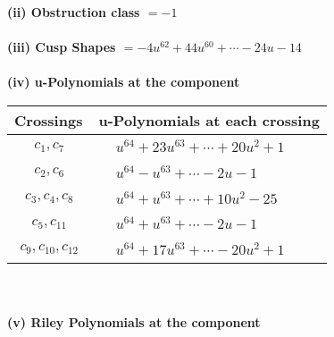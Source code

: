 \documentclass[1p]{elsarticle_modified}
\theoremstyle{definition}
\begin{document}
\flushleft \textbf{(ii) Obstruction class $= -1$}\\~\\
\flushleft \textbf{(iii) Cusp Shapes $= -4 u^{62}+44 u^{60}+\cdots-24 u-14$}\\~\\
\newpage\renewcommand{\arraystretch}{1}
\flushleft \textbf{(iv) u-Polynomials at the component}\newline \\
\begin{tabular}{m{50pt}|m{274pt}}
Crossings & \hspace{64pt}u-Polynomials at each crossing \\
\hline $$\begin{aligned}c_{1},c_{7}\end{aligned}$$&$\begin{aligned}
&u^{64}+23 u^{63}+\cdots+20 u^2+1
\end{aligned}$\\
\hline $$\begin{aligned}c_{2},c_{6}\end{aligned}$$&$\begin{aligned}
&u^{64}- u^{63}+\cdots-2 u-1
\end{aligned}$\\
\hline $$\begin{aligned}c_{3},c_{4},c_{8}\end{aligned}$$&$\begin{aligned}
&u^{64}+u^{63}+\cdots+10 u^2-25
\end{aligned}$\\
\hline $$\begin{aligned}c_{5},c_{11}\end{aligned}$$&$\begin{aligned}
&u^{64}+u^{63}+\cdots-2 u-1
\end{aligned}$\\
\hline $$\begin{aligned}c_{9},c_{10},c_{12}\end{aligned}$$&$\begin{aligned}
&u^{64}+17 u^{63}+\cdots-20 u^2+1
\end{aligned}$\\
\hline
\end{tabular}\\~\\
\newpage\renewcommand{\arraystretch}{1}
\flushleft \textbf{(v) Riley Polynomials at the component}\newline \\
\end{document}
